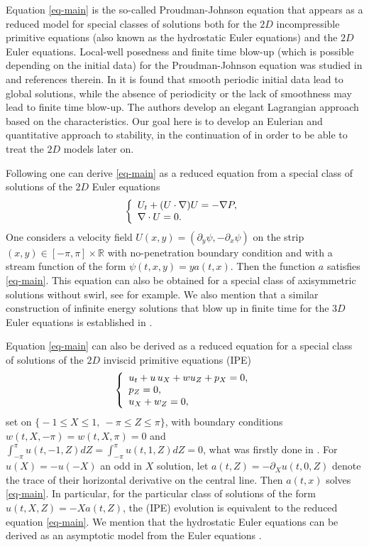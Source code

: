 \documentclass[12pt]{amsart}
\numberwithin{equation}{section}
\numberwithin{equation}{section}
\begin{document}
Equation \eqref{eq-main} is the so-called Proudman-Johnson equation \cite{PJ} that appears as a reduced model for special classes of solutions  both for the $2D$ incompressible primitive equations (also known as the hydrostatic Euler equations) and the $2D$ Euler equations. Local-well posedness and finite time blow-up (which is possible depending on the initial data) for the Proudman-Johnson equation was studied in \cite{CISY,CW,O,OZ} and references therein. In \cite{S,SS,SS2} it is found that smooth periodic initial data lead to global solutions, while the absence of periodicity or the lack of smoothness may lead to finite time blow-up. The authors develop an elegant Lagrangian approach based on the characteristics. Our goal here is to develop an Eulerian and quantitative approach to stability, in the continuation of \cite{CGIM,CIL} in order to be able to treat the $2D$ models later on.

Following \cite{PJ} one can derive \eqref{eq-main} as a reduced equation from a special class of solutions of the $2D$ Euler equations
$$
\left\{ \begin{array}{l l}
    U_t + (U\cdot \nabla )U=-\nabla P ,  \\
    \nabla \cdot U =0.
\end{array} \right. 
$$
One considers a velocity field $U(x,y)=(\partial_y \psi,-\partial_x \psi)$ on the strip $(x,y)\in [-\pi,\pi]\times \mathbb R$ with no-penetration boundary condition and with a stream function of the form $\psi(t,x,y)=ya(t,x)$. Then the function $a$ satisfies \eqref{eq-main}. This equation can also be obtained for a special class of axisymmetric solutions without swirl, see \cite{EW} for example.   We also mention that a similar construction of infinite energy solutions that blow up in finite time for the $3D$ Euler equations is established in \cite{PC}.

Equation \eqref{eq-main} can also be derived as a reduced equation for a special class of solutions of the $2D$ inviscid primitive  equations (IPE)
$$
\left\{ \begin{array}{l l}
    u_t + u\, u_X + w u_Z +p_X  = 0 ,  \\
    p_Z =0 , \\
    u_X + w_Z =0,  
\end{array} \right.
$$
set on $\big\{ -1\leq X \leq 1, \ -\pi \leq Z\leq \pi \big\}$, with boundary conditions $w(t,X,-\pi) = w(t,X,\pi) = 0$ and $\int_{-\pi}^\pi u(t,-1,Z) dZ = \int_{-\pi}^\pi u(t,1,Z) dZ = 0$, what was firstly done in \cite{CINT}. For $u(X)=-u(-X)$ an odd in $X$ solution, let $ a(t,Z)=-\partial_X u(t,0,Z)$ denote the trace of their horizontal derivative on the central line. Then $a(t,x)$ solves \eqref{eq-main}. In particular, for the particular class of solutions of the form $u(t,X,Z)=-Xa(t,Z)$, the (IPE) evolution is equivalent to the reduced equation \eqref{eq-main}. We mention that the hydrostatic Euler equations can be derived as an asymptotic model from the Euler equations \cite{Br,G}.
\end{document}
